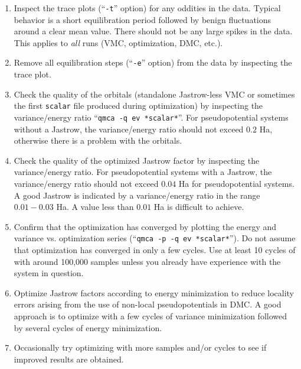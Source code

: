\begin{enumerate}
  \item{Inspect the trace plots (``\texttt{-t}'' option) for any 
    oddities in the data.  Typical behavior is a short equilibration 
    period followed by benign fluctuations around a clear mean value.  
    There should not be any large spikes in the data. This applies 
    to \emph{all} runs (VMC, optimization, DMC, etc.).}

  \item{Remove all equilibration steps (``\texttt{-e}'' option) from 
    the data by inspecting the trace plot.}

  \item{Check the quality of the orbitals (standalone Jastrow-less 
    VMC or sometimes the first \texttt{scalar} file produced during 
    optimization) by inspecting the variance/energy ratio 
    ``\texttt{qmca -q ev *scalar*}''.  For pseudopotential systems 
    without a Jastrow, the variance/energy ratio should not exceed 
    $0.2$ Ha, otherwise there is a problem with the orbitals.}

  \item{Check the quality of the optimized Jastrow factor by inspecting 
    the variance/energy ratio.  For pseudopotential systems with a 
    Jastrow, the variance/energy ratio should not exceed $0.04$ Ha 
    for pseudopotential systems.  A good Jastrow is indicated by a 
    variance/energy ratio in the range $0.01-0.03$ Ha.  A value less 
    than $0.01$ Ha is difficult to achieve.}

  \item{Confirm that the optimization has converged by plotting the 
    energy and variance vs. optimization series 
    (``\texttt{qmca -p -q ev *scalar*}'').  Do not assume that 
    optimization has converged in only a few cycles.  Use at least 
    10 cycles of with around 100,000 samples unless you already have 
    experience with the system in question.}

  \item{Optimize Jastrow factors according to energy minimization to 
    reduce locality errors arising from the use of non-local 
    pseudopotentials in DMC.  A good approach is to optimize with a 
    few cycles of variance minimization followed by several cycles of 
    energy minimization.}

  \item{Occasionally try optimizing with more samples and/or cycles 
    to see if improved results are obtained.}


\end{enumerate}

